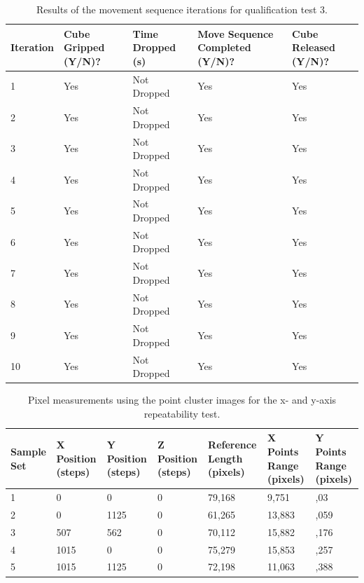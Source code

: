 \begin{table}[H]
	\renewcommand{\arraystretch}{1.3}
	\centering
	\begin{tabular}{|>{\raggedright}m{1.6cm}|>{\raggedright}m{2.6cm}|>{\raggedright}m{3.2cm}|>{\raggedright}m{3.3cm}|>{\raggedright\arraybackslash}m{2.6cm}|}
		\hline
		\textbf{Iteration} & \textbf{Cube Gripped (Y/N)?} & \textbf{Time Dropped (s)} & \textbf{Move Sequence Completed (Y/N)?} & \textbf{Cube Released (Y/N)?} \\
		\hline
		1 & Yes & Not Dropped & Yes & Yes \\ \hline
		2 & Yes & Not Dropped & Yes & Yes \\ \hline
		3 & Yes & Not Dropped & Yes & Yes \\ \hline
		4 & Yes & Not Dropped & Yes & Yes \\ \hline
		5 & Yes & Not Dropped & Yes & Yes \\ \hline
		6 & Yes & Not Dropped & Yes & Yes \\ \hline
		7 & Yes & Not Dropped & Yes & Yes \\ \hline
		8 & Yes & Not Dropped & Yes & Yes \\ \hline
		9 & Yes & Not Dropped & Yes & Yes \\ \hline
		10 & Yes & Not Dropped & Yes & Yes \\ \hline
	\end{tabular}
	\caption{\label{tab:techdoc-qtp3}Results of the movement sequence iterations for qualification test 3.}
\end{table}

\newpage


\begin{table}[H]
	\renewcommand{\arraystretch}{1.3}
	\centering
	\begin{tabular}{|>{\raggedright}m{1.5cm}|>{\raggedright}m{1.9cm}|>{\raggedright}m{1.9cm}|>{\raggedright}m{1.9cm}|>{\raggedright}m{1.8cm}|>{\raggedright}m{1.6cm}|>{\raggedright\arraybackslash}m{1.6cm}|}
		\hline
		\textbf{Sample Set} & \textbf{X Position (steps)} & \textbf{Y Position (steps)} & \textbf{Z Position (steps)} & \textbf{Reference Length (pixels)} & \textbf{X Points Range (pixels)} & \textbf{Y Points Range (pixels)} \\
		\hline
		1 & 0    & 0    & 0 & 79,168 & 9,751  & 8,03   \\
		\hline
		2 & 0    & 1125 & 0 & 61,265 & 13,883 & 11,059 \\
		\hline
		3 & 507  & 562  & 0 & 70,112 & 15,882 & 12,176 \\
		\hline
		4 & 1015 & 0    & 0 & 75,279 & 15,853 & 12,257 \\
		\hline
		5 & 1015 & 1125 & 0 & 72,198 & 11,063 & 8,388 \\
		\hline
	\end{tabular}
	\caption{\label{tab:techdoc-qtp4-xy1}Pixel measurements using the point cluster images for the x- and y-axis repeatability test.}
\end{table}

